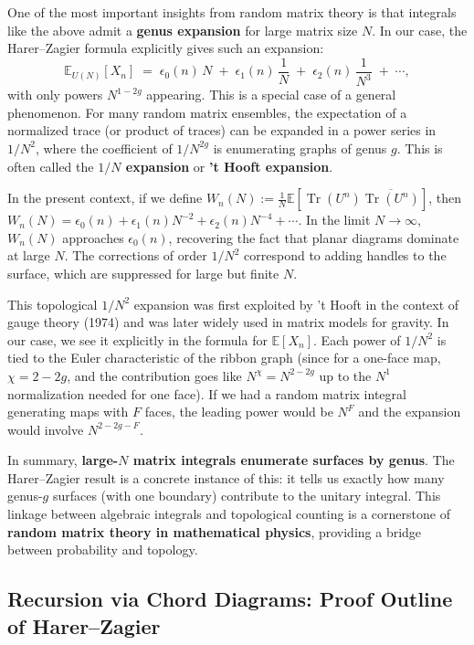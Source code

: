 \documentclass[letterpaper,11pt,oneside,reqno]{article}
\numberwithin{equation}{section}
\theoremstyle{definition}
\begin{document}
One of the most important insights from random matrix theory is that integrals like the above admit a \textbf{genus expansion} for large matrix size $N$. In our case, the Harer–Zagier formula explicitly gives such an expansion:
\[ \mathbb{E}_{U(N)}[X_n] \;=\; \epsilon_0(n)\,N \;+\; \epsilon_1(n)\,\frac{1}{N} \;+\; \epsilon_2(n)\,\frac{1}{N^3} \;+\; \cdots, \]
with only powers $N^{1-2g}$ appearing. This is a special case of a general phenomenon. For many random matrix ensembles, the expectation of a normalized trace (or product of traces) can be expanded in a power series in $1/N^2$, where the coefficient of $1/N^{2g}$ is enumerating graphs of genus $g$. This is often called the \textbf{$1/N$ expansion} or \textbf{'t Hooft expansion}.

In the present context, if we define $W_n(N) := \frac{1}{N}\mathbb{E}[\operatorname{Tr}(U^n)\overline{\operatorname{Tr}(U^n)}]$, then $W_n(N) = \epsilon_0(n) + \epsilon_1(n)N^{-2} + \epsilon_2(n)N^{-4} + \cdots$. In the limit $N\to\infty$, $W_n(N)$ approaches $\epsilon_0(n)$, recovering the fact that planar diagrams dominate at large $N$. The corrections of order $1/N^2$ correspond to adding handles to the surface, which are suppressed for large but finite $N$.

This topological $1/N^2$ expansion was first exploited by 't Hooft in the context of gauge theory (1974) and was later widely used in matrix models for gravity. In our case, we see it explicitly in the formula for $\mathbb{E}[X_n]$. Each power of $1/N^2$ is tied to the Euler characteristic of the ribbon graph (since for a one-face map, $\chi = 2-2g$, and the contribution goes like $N^{\chi} = N^{2-2g}$ up to the $N^1$ normalization needed for one face). If we had a random matrix integral generating maps with $F$ faces, the leading power would be $N^F$ and the expansion would involve $N^{2-2g - F}$.

In summary, \textbf{large-$N$ matrix integrals enumerate surfaces by genus}. The Harer–Zagier result is a concrete instance of this: it tells us exactly how many genus-$g$ surfaces (with one boundary) contribute to the unitary integral. This linkage between algebraic integrals and topological counting is a cornerstone of \textbf{random matrix theory in mathematical physics}, providing a bridge between probability and topology.

\subsection*{Recursion via Chord Diagrams: Proof Outline of Harer–Zagier}
\end{document}
